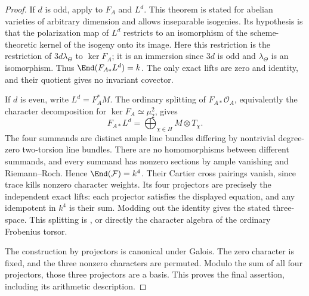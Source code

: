 \begin{proof}
If $d$ is odd, apply \cite[Theorem~1.2(i), printed p.~45; proof
pp.~43--45]{Oda1971} to $F_A$ and $L^d$.
This theorem is stated for abelian varieties of arbitrary dimension and
allows inseparable isogenies. Its hypothesis is that the polarization map
of $L^d$ restricts to an isomorphism of the scheme-theoretic kernel of the
isogeny onto its image. Here this restriction is the restriction of
$3d\lambda_\Theta$ to $\ker F_A$; it is an immersion since $3d$ is odd
and $\lambda_\Theta$ is an isomorphism. Thus
$\End(F_{A*}L^d)=k$. The only exact lifts are zero and identity, and their
quotient gives no invariant covector.

If $d$ is even, write $L^d=F_A^*M$.
The ordinary splitting of $F_{A*}\mathcal O_A$, equivalently the character
decomposition for $\ker F_A\simeq\mu_2^2$, gives
\[
          F_{A*}L^d=\bigoplus_{\chi\in H}M\otimes T_\chi.
\]
The four summands are distinct ample line bundles differing by nontrivial
degree-zero two-torsion line bundles. There are no homomorphisms between
different summands, and every summand has nonzero sections by ample
vanishing and Riemann--Roch. Hence $\End(\mathcal F)=k^4$.
Their Cartier cross pairings vanish, since trace kills nonzero character
weights. Its four projectors are precisely the independent exact lifts:
each projector satisfies the displayed equation, and any idempotent in
$k^4$ is their sum. Modding out the identity gives the stated three-space.
This splitting is \cite[Lemma~4.5, p.~11]{SannaiTanaka2016}, or directly
the character algebra of the ordinary Frobenius torsor.

The construction by projectors is canonical under Galois. The zero
character is fixed, and the three nonzero characters are permuted.
Modulo the sum of all four projectors, those three projectors are a basis.
This proves the final assertion, including its arithmetic description.
\end{proof}

